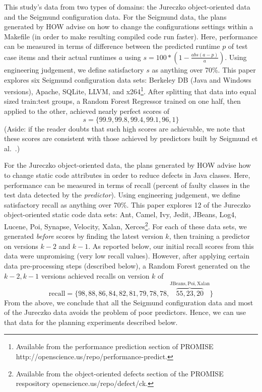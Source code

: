 \documentclass[conference]{IEEEtran}
\begin{document}
{This study's data from two types of domains: the Jureczko   object-oriented data  
and the Seigmund configuration data. 
For the Seigmund data, the plans generated by HOW advise on how  to change the   configurations settings within a Makefile
(in order to make resulting compiled
code  run faster). Here, performance can be measured in terms of  difference
between the predicted runtime $p$ of test case items and their actual runtimes $a$
using  $s= 100*(1- \frac{abs(a - p)}{a})$.
Using engineering judgement, we define satisfactory $s$ as anything over   70\%. 
This paper  explores    six Seigmund configuration data sets:  Berkeley DB (Java and Windows versions), Apache, SQLite, LLVM, and
  x264\footnote{Available from the performance prediction section of PROMISE
  http://openscience.us/repo/performance-predict.}. 
  After splitting that data into equal sized train:test groups, a Random Forest
  Regressor trained on one half, then applied to the other, achieved nearly perfect scores of
\[s=\{99.9, 99.8, 99.4, 99.1, 96,1\}\]
(Aside: if the reader doubts that such high scores are achievable, we note that these scores are 
consistent with those achieved by predictors built by Seigmund et al.~\cite{sven12}.)

For the  Jureczko   object-oriented data,
the plans generated by HOW advise   how to change static code attributes in order to reduce defects in
Java classes.  Here,
performance can be measured in terms of recall (percent of faulty classes in
the test data detected
by the {\em predictor}). Using engineering judgement, we define satisfactory recall as anything over   70\%. 
This paper explores 12 of the Jureczko   object-oriented static code data sets: Ant, Camel, Ivy, Jedit, JBeans, Log4, Lucene, Poi, Synapse, Velocity, Xalan, Xerces\footnote{Available from the object-oriented defects section of the PROMISE respository openscience.us/repo/defect/ck.}.
For each of these data sets, we generated  {\em before} scores  by finding the latest
version $k$, then training  a predictor on versions $k-2$ and $k-1$. As reported below,
our initial recall scores from this data were unpromising (very low recall values). However,
after applying certain data pre-processing steps (described below), a Random Forest generated
on the $k-2,k-1$ versions achieved recalls on version $k$ of
\[\mathrm{recall}=\{98,88,86,84,82,81,79,78,78,\overbrace{55,23,20}^{\mathrm{JBeans,Poi,Xalan}}\}\]
From the above, we conclude that all the Seigmund configuration data and most of the Jureczko data
avoids the problem of poor predictors. Hence, we can use that data for the planning
experiments described below.
 
}
\end{document}

